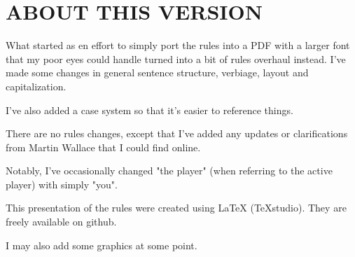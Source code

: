\section{ABOUT THIS VERSION}

What started as en effort to simply port the rules into a PDF with a larger font that my poor eyes could handle turned into a bit of rules overhaul instead. I've made some changes in general sentence structure, verbiage, layout and capitalization.

I've also added a case system so that it's easier to reference things.

There are no rules changes, except that I've added any updates or clarifications from Martin Wallace that I could find online.

Notably, I've occasionally changed "the player" (when referring to the active player) with simply "you".

This presentation of the rules were created using LaTeX (TeXstudio). They are freely available on github.

I may also add some graphics at some point.